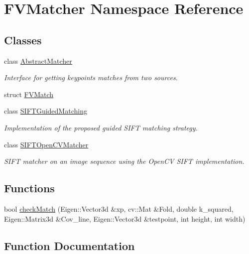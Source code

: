 \hypertarget{namespaceFVMatcher}{}\section{F\+V\+Matcher Namespace Reference}
\label{namespaceFVMatcher}
\subsection*{Classes}
\begin{DoxyCompactItemize}
\item 
class \hyperlink{classFVMatcher_1_1AbstractMatcher}{Abstract\+Matcher}
\begin{DoxyCompactList}\small\item\em Interface for getting keypoints matches from two sources. \end{DoxyCompactList}\item 
struct \hyperlink{structFVMatcher_1_1FVMatch}{F\+V\+Match}
\item 
class \hyperlink{classFVMatcher_1_1SIFTGuidedMatching}{S\+I\+F\+T\+Guided\+Matching}
\begin{DoxyCompactList}\small\item\em Implementation of the proposed guided S\+I\+F\+T matching strategy. \end{DoxyCompactList}\item 
class \hyperlink{classFVMatcher_1_1SIFTOpenCVMatcher}{S\+I\+F\+T\+Open\+C\+V\+Matcher}
\begin{DoxyCompactList}\small\item\em S\+I\+F\+T matcher on an image sequence using the Open\+C\+V S\+I\+F\+T implementation. \end{DoxyCompactList}\end{DoxyCompactItemize}
\subsection*{Functions}
\begin{DoxyCompactItemize}
\item 
bool \hyperlink{namespaceFVMatcher_a93764d97fb5a4a63cc23aa47c77416bc}{check\+Match} (Eigen\+::\+Vector3d \&xp, cv\+::\+Mat \&Fold, double k\+\_\+squared, Eigen\+::\+Matrix3d \&Cov\+\_\+line, Eigen\+::\+Vector3d \&testpoint, int height, int width)
\end{DoxyCompactItemize}


\subsection{Function Documentation}
\hypertarget{namespaceFVMatcher_a93764d97fb5a4a63cc23aa47c77416bc}{}
